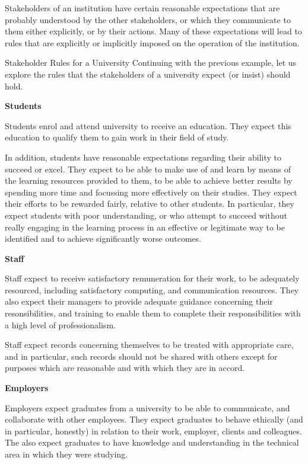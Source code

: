 Stakeholders of an institution have certain reasonable expectations that are
probably understood by the other stakeholders, or which they communicate to them
either explicitly, or by their actions. Many of these expectations will lead
to rules that are explicitly or implicitly imposed on the operation of the institution.

\begin{example}{Stakeholder Rules for a University}%
Continuing with the previous example, let us explore the rules that the stakeholders of a university
expect (or insist) should hold.

{\bf Students}

Students enrol and attend university to receive an education. They expect this education to qualify
them to gain work in their field of study. 

In addition, students have reasonable expectations regarding their ability to succeed or excel.
They expect to be able to make use of and learn by means of the learning resources provided to
them, to be able to achieve better results by spending more time and focussing more effectively
on their studies. They expect their efforts to be rewarded fairly, relative to other students.
In particular, they expect students with poor understanding, or who attempt to succeed without
really engaging in the learning process in an effective or legitimate way to be identified and
to achieve significantly worse outcomes.



{\bf Staff}

Staff expect to receive satisfactory remuneration for their work, to be adequately resourced,
including satisfactory computing, and communication resources. They also expect their managers
to provide adequate guidance concerning their resonsibilities, and training to enable them
to complete their responsibilities with a high level of professionalism.


Staff expect records concerning themselves to be treated with appropriate care, and in particular,
such records should not be shared with others except for purposes which are reasonable and 
with which they are in accord.

{\bf Employers}

Employers expect graduates from a university to be able to communicate, and collaborate with
other employees. They expect graduates to behave ethically (and in particular, honestly) in relation
to their work, employer, clients and colleagues. The also expect graduates to have knowledge
and understanding in the technical area in which they were studying.


\end{example}

